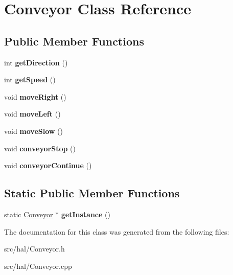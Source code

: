 \hypertarget{classConveyor}{\section{Conveyor Class Reference}
\label{classConveyor}
}
\subsection*{Public Member Functions}
\begin{DoxyCompactItemize}
\item 
\hypertarget{classConveyor_a66b286ad2eee002c8c90f762c4b5aac3}{int {\bfseries get\-Direction} ()}\label{classConveyor_a66b286ad2eee002c8c90f762c4b5aac3}

\item 
\hypertarget{classConveyor_ae1e768294bc1ea396b0cebc8370ca974}{int {\bfseries get\-Speed} ()}\label{classConveyor_ae1e768294bc1ea396b0cebc8370ca974}

\item 
\hypertarget{classConveyor_a95c2fc53e084fac45a2413c772e71f60}{void {\bfseries move\-Right} ()}\label{classConveyor_a95c2fc53e084fac45a2413c772e71f60}

\item 
\hypertarget{classConveyor_a56974e04b8a8e5e760cf59f138888186}{void {\bfseries move\-Left} ()}\label{classConveyor_a56974e04b8a8e5e760cf59f138888186}

\item 
\hypertarget{classConveyor_a9623a77db4c6f9f05455984c9ad41cdf}{void {\bfseries move\-Slow} ()}\label{classConveyor_a9623a77db4c6f9f05455984c9ad41cdf}

\item 
\hypertarget{classConveyor_a2c340ffa3cad9eefd46599a5bf6e07ba}{void {\bfseries conveyor\-Stop} ()}\label{classConveyor_a2c340ffa3cad9eefd46599a5bf6e07ba}

\item 
\hypertarget{classConveyor_a8e7b841155d2f19b42663454d28e9928}{void {\bfseries conveyor\-Continue} ()}\label{classConveyor_a8e7b841155d2f19b42663454d28e9928}

\end{DoxyCompactItemize}
\subsection*{Static Public Member Functions}
\begin{DoxyCompactItemize}
\item 
\hypertarget{classConveyor_a803ec148c4cbb9b9131b67a10d4a5f7f}{static \hyperlink{classConveyor}{Conveyor} $\ast$ {\bfseries get\-Instance} ()}\label{classConveyor_a803ec148c4cbb9b9131b67a10d4a5f7f}

\end{DoxyCompactItemize}


The documentation for this class was generated from the following files\-:\begin{DoxyCompactItemize}
\item 
src/hal/Conveyor.\-h\item 
src/hal/Conveyor.\-cpp\end{DoxyCompactItemize}
